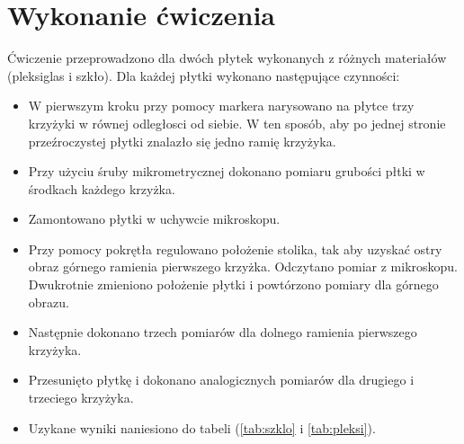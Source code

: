 \documentclass [a4paper,11pt]{article}
\begin{document}
	\section{Wykonanie ćwiczenia}
	Ćwiczenie przeprowadzono dla dwóch płytek wykonanych z różnych materiałów (pleksiglas i szkło).
	Dla każdej płytki wykonano następujące czynności:
	\begin{itemize}
		\item W pierwszym kroku przy pomocy markera narysowano na płytce trzy krzyżyki w równej odległosci od siebie.
		W ten sposób, aby po jednej stronie przeźroczystej płytki znalazło się jedno ramię krzyżyka.
		\item 
			Przy użyciu śruby mikrometrycznej dokonano pomiaru grubości płtki w 
			środkach każdego krzyżka.
		\item Zamontowano płytki w uchywcie mikroskopu. 
		\item Przy pomocy pokrętła regulowano położenie stolika, tak aby uzyskać ostry obraz 
		górnego ramienia pierwszego krzyżka.  Odczytano pomiar z mikroskopu. Dwukrotnie zmieniono położenie płytki i powtórzono pomiary dla górnego obrazu.
		\item Następnie dokonano trzech pomiarów dla dolnego ramienia pierwszego krzyżyka.
		\item Przesunięto płytkę i dokonano analogicznych pomiarów dla drugiego i trzeciego krzyżyka.
		\item Uzykane wyniki naniesiono do tabeli (\ref{tab:szklo} i \ref{tab:pleksi}).  
	\end{itemize}
	
\end{document}
